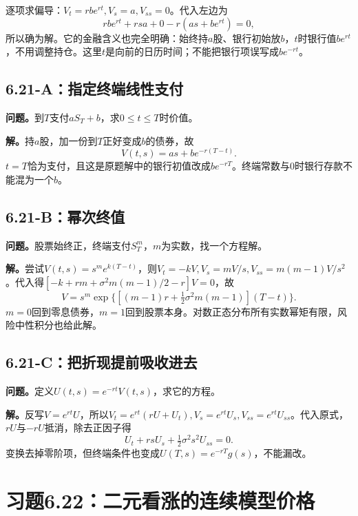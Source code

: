 \documentclass[11pt,a4paper,UTF8,fontset=fandol]{ctexart}
\begin{document}
逐项求偏导：\(V_t=rbe^{rt},V_s=a,V_{ss}=0\)。代入左边为
\[rbe^{rt}+rsa+0-r(as+be^{rt})=0,\]
所以确为解。它的金融含义也完全明确：始终持\(a\)股、银行初始放\(b\)，\(t\)时银行值\(be^{rt}\)，不用调整持仓。这里\(t\)是向前的日历时间；不能把银行项误写成\(be^{-rt}\)。

\subsection{6.21-A：指定终端线性支付}\label{aux6307ux5b9aux7ec8ux7aefux7ebfux6027ux652fux4ed8}

\textbf{问题。}到\(T\)支付\(aS_T+b\)，求\(0\le t\le T\)时价值。

\textbf{解。}持\(a\)股，加一份到\(T\)正好变成\(b\)的债券，故
\[\boxed{V(t,s)=as+be^{-r(T-t)}.}\]
\(t=T\)恰为支付，且这是原题解中的银行初值改成\(be^{-rT}\)。终端常数与0时银行存款不能混为一个\(b\)。

\subsection{6.21-B：幂次终值}\label{bux5e42ux6b21ux7ec8ux503c}

\textbf{问题。}股票始终正，终端支付\(S_T^m\)，\(m\)为实数，找一个方程解。

\textbf{解。}尝试\(V(t,s)=s^me^{k(T-t)}\)，则\(V_t=-kV,V_s=mV/s,V_{ss}=m(m-1)V/s^2\)。代入得\([-k+rm+\sigma^2m(m-1)/2-r]V=0\)，故
\[\boxed{V=s^m\exp\{[(m-1)r+\tfrac12\sigma^2m(m-1)](T-t)\}.}\]
\(m=0\)回到零息债券，\(m=1\)回到股票本身。对数正态分布所有实数幂矩有限，风险中性积分也给此解。

\subsection{6.21-C：把折现提前吸收进去}\label{cux628aux6298ux73b0ux63d0ux524dux5438ux6536ux8fdbux53bb}

\textbf{问题。}定义\(U(t,s)=e^{-rt}V(t,s)\)，求它的方程。

\textbf{解。}反写\(V=e^{rt}U\)，所以\(V_t=e^{rt}(rU+U_t),V_s=e^{rt}U_s,V_{ss}=e^{rt}U_{ss}\)。代入原式，\(rU\)与\(-rU\)抵消，除去正因子得
\[\boxed{U_t+rsU_s+\tfrac12\sigma^2s^2U_{ss}=0.}\]
变换去掉零阶项，但终端条件也变成\(U(T,s)=e^{-rT}g(s)\)，不能漏改。

\bigskip

\section{习题6.22：二元看涨的连续模型价格}\label{ux4e60ux98986.22ux4e8cux5143ux770bux6da8ux7684ux8fdeux7eedux6a21ux578bux4ef7ux683c}
\end{document}
